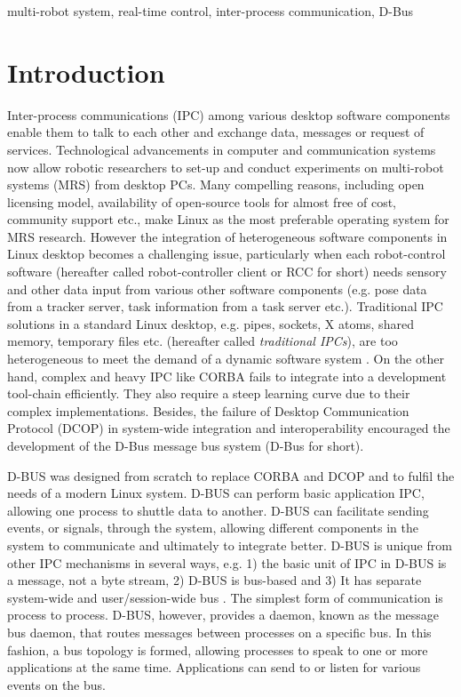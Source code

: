 \documentclass{ifacconf}
\begin{document}
\begin{frontmatter}
\begin{keyword}
multi-robot system, real-time control, inter-process communication, D-Bus
\end{keyword}

\end{frontmatter}
\section{Introduction}
Inter-process communications (IPC) among various desktop software components enable them to talk to each other and exchange data, messages or request of services. Technological advancements in computer and communication systems  now allow robotic researchers to set-up and conduct experiments on multi-robot systems (MRS) from  desktop PCs. Many compelling reasons, including open licensing model, availability of open-source tools for almost free of cost, community support etc., make Linux as the most preferable operating system for MRS research. However the integration of heterogeneous software components in Linux desktop becomes a challenging issue, particularly when each robot-control software (hereafter called robot-controller client or RCC for short) needs sensory and other data input from various other software components (e.g. pose data from a tracker server, task information from a task server etc.).  
Traditional IPC solutions in a standard Linux desktop, e.g. pipes, sockets, X atoms, shared memory, temporary files etc. (hereafter called {\em traditional IPCs}),  are too heterogeneous to meet the demand of a dynamic software system \cite{Wittenburg2005}. On the other hand, complex and heavy IPC like CORBA fails to integrate into a development tool-chain efficiently. They also require a steep learning curve due to their complex implementations. Besides, the failure of Desktop Communication Protocol (DCOP) in system-wide integration and interoperability encouraged the development  of the D-Bus message bus system (D-Bus for short).

D-BUS was designed from scratch to replace CORBA and DCOP and to fulfil the needs of a modern Linux system. D-BUS can perform basic application IPC, allowing one process to shuttle data to another. D-BUS can facilitate sending events, or signals, through the system, allowing different components in the system to communicate and ultimately to integrate better. D-BUS is unique from other IPC mechanisms in several ways, e.g. 1) the basic unit of IPC in D-BUS is a message, not a byte stream, 2) D-BUS is bus-based and 3) It has separate system-wide and user/session-wide bus  \cite{Love2006} . The simplest form of communication is process to process. D-BUS, however, provides a daemon, known as the message bus daemon, that routes messages between processes on a specific bus. In this fashion, a bus topology is formed, allowing processes to speak to one or more applications at the same time. Applications can send to or listen for various events on the bus.
\end{document}
